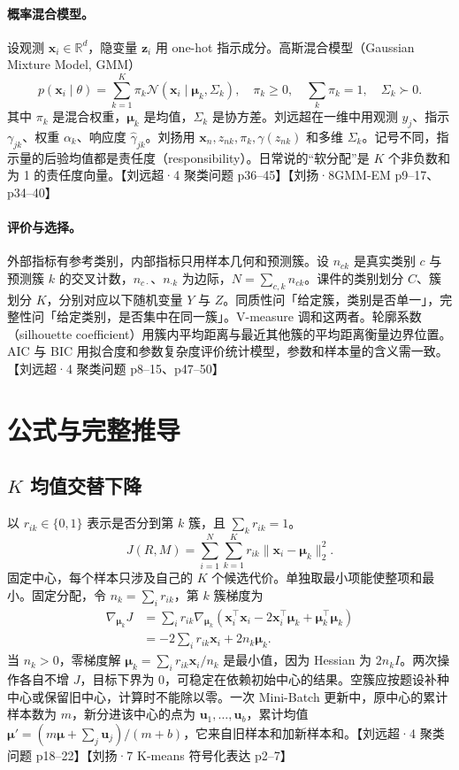 \documentclass[UTF8,a4paper,zihao=-4,fontset=fandol]{ctexrep}
\begin{document}
\paragraph{概率混合模型。}
设观测 $\bm x_i\in\mathbb R^d$，隐变量 $\bm z_i$ 用 one-hot 指示成分。高斯混合模型（Gaussian Mixture Model, GMM）
\[
p(\bm x_i\mid\theta)=\sum_{k=1}^K\pi_k\mathcal N(\bm x_i\mid\bm\mu_k,\Sigma_k),
\quad \pi_k\ge0,\quad\sum_k\pi_k=1,\quad \Sigma_k\succ0 .
\]
其中 $\pi_k$ 是混合权重，$\bm\mu_k$ 是均值，$\Sigma_k$ 是协方差。刘远超在一维中用观测 $y_j$、指示 $\gamma_{jk}$、权重 $\alpha_k$、响应度 $\widehat\gamma_{jk}$。刘扬用 $\bm x_n,z_{nk},\pi_k,\gamma(z_{nk})$ 和多维 $\Sigma_k$。记号不同，指示量的后验均值都是责任度（responsibility）。日常说的“软分配”是 $K$ 个非负数和为 1 的责任度向量。【刘远超·4 聚类问题 p36–45】【刘扬·8GMM-EM p9–17、p34–40】

\paragraph{评价与选择。}
外部指标有参考类别，内部指标只用样本几何和预测簇。设 $n_{ck}$ 是真实类别 $c$ 与预测簇 $k$ 的交叉计数，$n_{c\cdot}$、$n_{\cdot k}$ 为边际，$N=\sum_{c,k}n_{ck}$。课件的类别划分 $C$、簇划分 $K$，分别对应以下随机变量 $Y$ 与 $Z$。同质性问「给定簇，类别是否单一」，完整性问「给定类别，是否集中在同一簇」。V-measure 调和这两者。轮廓系数（silhouette coefficient）用簇内平均距离与最近其他簇的平均距离衡量边界位置。AIC 与 BIC 用拟合度和参数复杂度评价统计模型，参数和样本量的含义需一致。 【刘远超·4 聚类问题 p8–15、p47–50】

\section{公式与完整推导}

\subsection{$K$ 均值交替下降}
以 $r_{ik}\in\{0,1\}$ 表示是否分到第 $k$ 簇，且 $\sum_k r_{ik}=1$。
\[
J(R,M)=\sum_{i=1}^N\sum_{k=1}^K r_{ik}\|\bm x_i-\bm\mu_k\|_2^2.
\]
固定中心，每个样本只涉及自己的 $K$ 个候选代价。单独取最小项能使整项和最小。固定分配，令 $n_k=\sum_i r_{ik}$，第 $k$ 簇梯度为
\[
\begin{aligned}
\nabla_{\bm\mu_k}J
&=\sum_i r_{ik}\nabla_{\bm\mu_k}
   (\bm x_i^\top\bm x_i-2\bm x_i^\top\bm\mu_k+\bm\mu_k^\top\bm\mu_k)\\
&=-2\sum_i r_{ik}\bm x_i+2 n_k\bm\mu_k .
\end{aligned}
\]
当 $n_k>0$，零梯度解 $\bm\mu_k=\sum_i r_{ik}\bm x_i/n_k$ 是最小值，因为 Hessian 为 $2n_k I$。两次操作各自不增 $J$，目标下界为 0，可稳定在依赖初始中心的结果。空簇应按题设补种中心或保留旧中心，计算时不能除以零。一次 Mini-Batch 更新中，原中心的累计样本数为 $m$，新分进该中心的点为 $\bm u_1,\ldots,\bm u_b$，累计均值
$\bm\mu'=(m\bm\mu+\sum_j\bm u_j)/(m+b)$，它来自旧样本和加新样本和。【刘远超·4 聚类问题 p18–22】【刘扬·7 K-means 符号化表达 p2–7】
\end{document}
